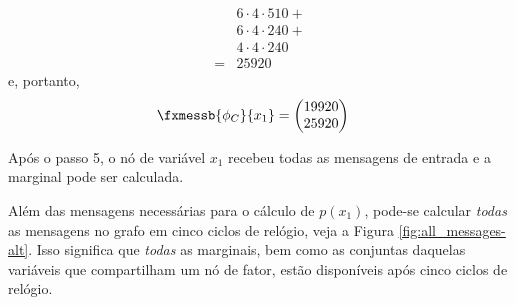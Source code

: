 \begin{exenumerate}
\begin{solution}
\begin{align}
            &  6 \cdot 4 \cdot 510 +  \\
            &  6 \cdot 4 \cdot 240  + \\
            &  4 \cdot 4 \cdot 240 \\
            = & 25920                 
        \end{align}
        e, portanto,
        \begin{align}
            \fxmessb{\phi_C}{x_1} &= \begin{pmatrix}
                19920\\
                25920
            \end{pmatrix}
        \end{align}
        
        Ap\'os o passo 5, o n\'o de vari\'avel $x_1$ recebeu todas as mensagens de entrada e a marginal pode ser calculada.
        
        Al\'em das mensagens necess\'arias para o c\'alculo de $p(x_1)$, pode-se
        calcular \emph{todas} as mensagens no grafo em cinco ciclos de rel\'ogio, veja
        a Figura \ref{fig:all_messages-alt}. Isso significa que \emph{todas} as marginais,
        bem como as conjuntas daquelas vari\'aveis que compartilham um n\'o de fator, est\~ao
        dispon\'iveis ap\'os cinco ciclos de rel\'ogio.
        
        \begin{figure}[h]
            \begin{center}
\end{center}
\end{figure}
\end{solution}
\end{exenumerate}
